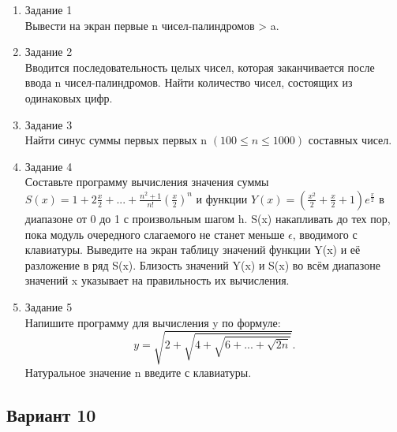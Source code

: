 \documentclass[a4paper]{article}
\begin{document}
	
	\begin{enumerate} 
		\item Задание 1 \\
		Вывести на экран первые n чисел-палиндромов > a.\\
		\item Задание 2\\
		Вводится последовательность целых чисел, которая заканчивается после ввода n чисел-палиндромов. 
		Найти количество чисел, состоящих из одинаковых цифр.\\
		\item Задание 3 \\
		Найти синус суммы первых первых n $(100 \le n \le 1000) $ составных чисел.\\
		\item Задание 4 \\ 
		Составьте программу вычисления значения суммы  $S(x)=1+2\frac{x}{2}+...+\frac{n^2+1}{n!}{(\frac{x}{2})^n}$
		и функции $Y(x)=(\frac{x^2}{2}+\frac{x}{2}+1)e^{\frac{x}{2}}$ в диапазоне от 0 до 1
		с произвольным шагом h. S(x) накапливать до тех пор, пока модуль очередного слагаемого не станет меньше $\epsilon$, вводимого с клавиатуры.  Выведите на экран таблицу значений функции Y(x) и её разложение в ряд S(x). Близость значений Y(x) и S(x) во всём диапазоне
		значений x указывает на правильность их вычисления.\\
		\item Задание 5 \\
		Напишите программу для вычисления y по формуле:\\
		$$y=\sqrt{2+\sqrt{4+\sqrt{6+...+\sqrt{2n}}}}.$$
		Натуральное значение n введите с клавиатуры.\\
	\end{enumerate}
\newpage
	\begin{center}
		\subsection*{Вариант 10}
	\end{center}
	
\end{document}
